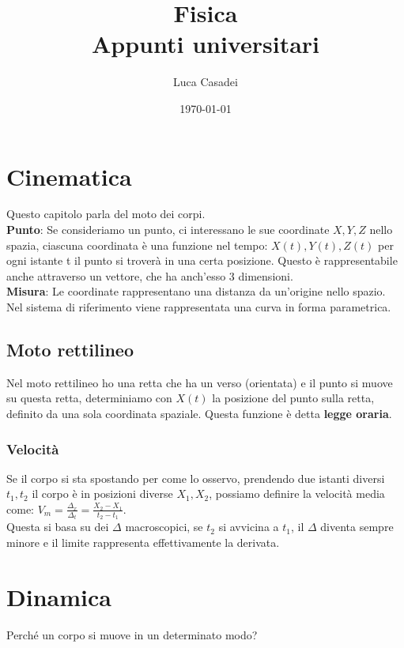 \documentclass[a4paper,12pt]{report}
\title{\textbf{Fisica}\\Appunti universitari}
\author{Luca Casadei}
\date{\today}
\begin{document}
	\maketitle
	\tableofcontents
	\chapter{Cinematica}
	Questo capitolo parla del moto dei corpi.\\
	\textbf{Punto}: Se consideriamo un punto, ci interessano le sue coordinate ${X,Y,Z}$ nello spazia, ciascuna coordinata è una funzione nel tempo:
	${X(t),Y(t),Z(t)}$ per ogni istante t il punto si troverà in una certa posizione. Questo è rappresentabile anche attraverso un vettore, che ha anch'esso 3 dimensioni.\\
	\textbf{Misura}: Le coordinate rappresentano una distanza da un'origine nello spazio.
	Nel sistema di riferimento viene rappresentata una curva in forma parametrica.
	\section{Moto rettilineo}
	Nel moto rettilineo ho una retta che ha un verso (orientata) e il punto si muove su questa retta, determiniamo con ${X(t)}$ la posizione del punto sulla retta, definito da una sola coordinata spaziale. Questa funzione è detta \textbf{legge oraria}.
	\subsection{Velocità}
	Se il corpo si sta spostando per come lo osservo, prendendo due istanti diversi ${t_1,t_2}$ il corpo è in posizioni diverse ${X_1,X_2}$, possiamo definire la velocità media come: ${V_m = \frac{\Delta_x}{\Delta_t} = \frac{X_2 - X_1}{t_2 - t_1}}$.\\
	Questa si basa su dei ${\Delta}$ macroscopici, se ${t_2}$ si avvicina a ${t_1}$, il ${\Delta}$ diventa sempre minore e il limite rappresenta effettivamente la derivata.
	\chapter{Dinamica}
	Perché un corpo si muove in un determinato modo?
\end{document}
